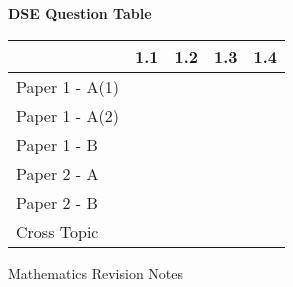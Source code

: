 \documentclass[12pt, a4paper]{article}
\begin{document}
\begin{absolutelynopagebreak}
\begin{center}
\textbf{DSE Question Table}
\end{center}
\begin{center}
\begin{tabular}{|l|c|c|c|c|}
\hline
        & 1.1 & 1.2 & 1.3 & 1.4 \\\hline
\hline
Paper 1 - A(1)&  &  &  &  \\
\hline
Paper 1 - A(2)&  &  &  &  \\
\hline
Paper 1 - B&  &  &  &  \\
\hline
\hline
Paper 2 - A&  &  &  &  \\
\hline
Paper 2 - B&  &  &  &  \\
\hline
\hline
Cross Topic&  &  &  &  \\
\hline
\end{tabular}
\end{center}
\end{absolutelynopagebreak}
\newpage
\newpage
\thispagestyle{empty}
\begin{center}
Mathematics Revision Notes\\\vspace{1cm}
\\\vspace{1cm}
{\fontsize{24pt}{24pt}\selectfont {Introduction to Algebra}} \\\vspace{1cm}
\label{chapter:S1-2}

\end{center}
\vspace{0.5cm}
\hline
\end{document}
